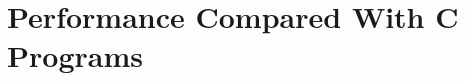 \documentclass{llncs}
\begin{document}
\begin{comment}
\begin{code}
let f = inc
in f y : map f ys
\end{code}

If |f| is not inlined, then the recursive call to |map| would still contain a functional variable to be passed at runtime. But how can we tell whether |inc| is cheap enough to be inlined? The solution is to optimise |inc| first:

\begin{code}
let f = \x -> x + 1
in f y : map f ys
\end{code}

It is now clear that |f| is a lambda, so no shared computation is lost by inlining it.

\subsection{CAF's}
\label{sec:caf}

A CAF (constant applicative form) is a top level definition of zero arity. In Haskell, CAFs are computed at most once per program run, and retained as long as references to them remain. Consider the program:

\begin{code}
caf = expensive

main = caf + caf
\end{code}

In this program |caf| would only be computed once. If a CAF is inlined then this may result in a computation being performed more than would otherwise occur. To ensure that we do not duplicate computations, we never inline CAF's.

\end{comment}

\section{Performance Compared With C Programs}
\label{sec:c_results}

\begin{comment}
The most comprehensive inter-language benchmarking effort is the Programming Language Shootout\footnote{\url{http://shootout.alioth.debian.org/}}. In the shootout a variety of tasks are implemented in many languages and benchmarked against each other. Unfortunately, in order to ensure a balanced comparison, many restrictions are placed upon the solutions -- some of which severely hamper lazy languages. Inspired by their attempt, we have defined some simpler benchmarks on which it is possible to directly compare Haskell to C.
\end{comment}
\end{document}
